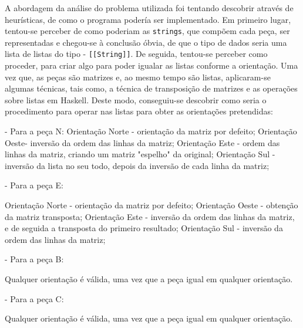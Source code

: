 A  abordagem  da  análise  do  problema  utilizada  foi  tentando  descobrir  através  de  heurísticas,  de
como  o programa  podería  ser  implementado. Em  primeiro  lugar, tentou-se  perceber  de  como poderiam  as
\texttt{strings}, que compõem cada  peça, ser representadas e chegou-se à conclusão óbvia,  de que o tipo
de  dados seria  uma lista  de  listas do  tipo -  \texttt{[[String]]}.  De seguida,  tentou-se perceber  como
proceder, para criar  algo para poder igualar as listas  conforme a orientação. Uma vez que,  as peças são
matrizes  e,  ao  mesmo  tempo  são  listas,  aplicaram-se  algumas  técnicas,  tais  como,  a  técnica  de
transposição de matrizes e  as operações sobre listas em Haskell. Deste  modo, conseguiu-se descobrir como
seria o procedimento para operar nas listas para obter as orientações pretendidas:

- Para a peça N:
			 Orientação Norte - orientação da matriz por defeito;
			 Orientação Oeste- inversão da ordem das linhas da matriz;
			 Orientação Este - ordem das linhas da matriz, criando um matriz "espelho" da original;
			 Orientação Sul - inversão da lista no seu todo, depois da inversão de cada linha da matriz;
	
- Para a peça E:
		
			 Orientação Norte - orientação da matriz por defeito;
			 Orientação Oeste - obtenção da matriz transposta;
		     Orientação Este - inversão da ordem das linhas da matriz, e de seguida a transposta do primeiro resultado; 
			 Orientação Sul - inversão da ordem das linhas da matriz;
		
- Para a peça B:
		
			 Qualquer orientação é válida, uma vez que a peça igual em qualquer orientação.

		
- Para a peça C:
		
	        Qualquer orientação é válida, uma vez que a peça igual em qualquer orientação.
		



